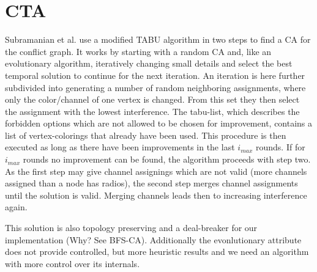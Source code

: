   \section{\ac{CTA}}
    Subramanian et al.\cite{CTA} use a modified TABU algorithm \cite{tabu} in two steps to find a \ac{CA} for the conflict graph.
    It works by starting with a random \ac{CA} and, like an evolutionary algorithm, 
    iteratively changing small details and select the best temporal solution to continue for the next iteration.
    An iteration is here further subdivided into generating a number of random neighboring assignments, where only the color/channel of one vertex is changed.
    From this set they then select the assignment with the lowest interference.
    The tabu-list, which describes the forbidden options which are not allowed to be chosen for improvement, contains a list of vertex-colorings that already have been used.
    This procedure is then executed as long as there have been improvements in the last \textit{$i_{max}$} rounds.
    If for \textit{$i_{max}$} rounds no improvement can be found, the algorithm proceeds with step two.
    As the first step may give channel assignings which are not valid (more channels assigned than a node has radios), the second step merges channel assignments 
    until the solution is valid. Merging channels leads then to increasing interference again.
    
    This solution is also topology preserving and a deal-breaker for our implementation (Why? See BFS-CA).
    Additionally the evonlutionary attribute does not provide controlled, but more heuristic results and we need an algorithm with more control over its internals.